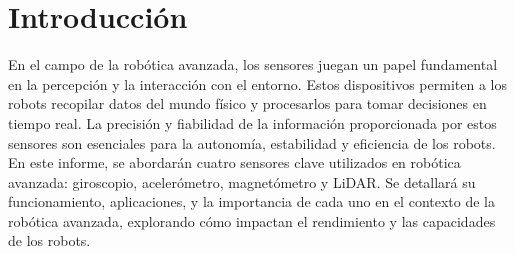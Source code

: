 \section{Introducción}
En el campo de la robótica avanzada, los sensores juegan un papel fundamental en la percepción y la interacción con el entorno. Estos dispositivos permiten a los robots recopilar datos del mundo físico y procesarlos para tomar decisiones en tiempo real. La precisión y fiabilidad de la información proporcionada por estos sensores son esenciales para la autonomía, estabilidad y eficiencia de los robots. En este informe, se abordarán cuatro sensores clave utilizados en robótica avanzada: giroscopio, acelerómetro, magnetómetro y LiDAR. Se detallará su funcionamiento, aplicaciones, y la importancia de cada uno en el contexto de la robótica avanzada, explorando cómo impactan el rendimiento y las capacidades de los robots.